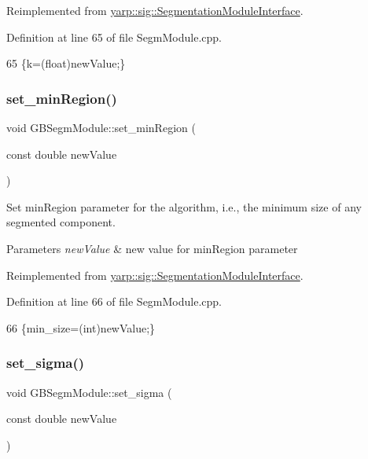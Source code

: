 Reimplemented from \hyperlink{classyarp_1_1sig_1_1SegmentationModuleInterface_a2851eae0226ad68f41cd8b61d8bb1456}{yarp\+::sig\+::\+Segmentation\+Module\+Interface}.



Definition at line 65 of file Segm\+Module.\+cpp.


\begin{DoxyCode}
65 \{k=(float)newValue;\}
\end{DoxyCode}
\mbox{\label{classGBSegmModule_ae1c722c9c774cbde4f6bfada3f0826ba}} 
\subsubsection{\texorpdfstring{set\+\_\+min\+Region()}{set\_minRegion()}}
{\footnotesize\ttfamily void G\+B\+Segm\+Module\+::set\+\_\+min\+Region (\begin{DoxyParamCaption}\item[{const double}]{new\+Value }\end{DoxyParamCaption})\hspace{0.3cm}{\ttfamily [virtual]}}



Set min\+Region parameter for the algorithm, i.\+e., the minimum size of any segmented component. 


\begin{DoxyParams}{Parameters}
{\em new\+Value} & new value for min\+Region parameter \\
\hline
\end{DoxyParams}


Reimplemented from \hyperlink{classyarp_1_1sig_1_1SegmentationModuleInterface_ad9d90ed7e362ae83e2145445a9c4301e}{yarp\+::sig\+::\+Segmentation\+Module\+Interface}.



Definition at line 66 of file Segm\+Module.\+cpp.


\begin{DoxyCode}
66 \{min\_size=(int)newValue;\}
\end{DoxyCode}
\mbox{\label{classGBSegmModule_a27ffe08d394d321d9f9441423d36ef5e}} 
\subsubsection{\texorpdfstring{set\+\_\+sigma()}{set\_sigma()}}
{\footnotesize\ttfamily void G\+B\+Segm\+Module\+::set\+\_\+sigma (\begin{DoxyParamCaption}\item[{const double}]{new\+Value }\end{DoxyParamCaption})\hspace{0.3cm}{\ttfamily [virtual]}}



